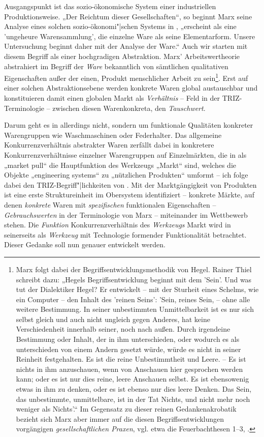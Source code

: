 \documentclass[12pt,a4paper]{article}
\begin{document}
Ausgangspunkt ist das sozio-ökonomische System einer industriellen
Produktionsweise. „Der Reichtum dieser Gesellschaften“, so beginnt Marx seine
Analyse eines solchen sozio-ökonomi"|schen Systems in \cite{MEW23}, „erscheint
als eine 'ungeheure Warensammlung', die einzelne Ware als seine
Elementarform. Unsere Untersuchung beginnt daher mit der Analyse der Ware.“
Auch wir starten mit diesem Begriff als einer hochgradigen Abstraktion.  Marx'
Arbeitswertheorie abstrahiert im Begriff der \emph{Ware} bekanntlich von
sämtlichen qualitativen Eigenschaften außer der einen, Produkt menschlicher
Arbeit zu sein\footnote{Marx folgt dabei der Begriffsentwicklungsmethodik von
  Hegel. Rainer Thiel \cite[S. 190]{Thiel2007} schreibt dazu: „Hegels
  Begriffsentwicklung beginnt mit dem 'Sein'. Und was tut der Dialektiker
  Hegel? Er entwickelt – mit der Sturheit eines Schelms, wie ein Computer –
  den Inhalt des 'reinen Seins': 'Sein, reines Sein, -- ohne alle weitere
  Bestimmung. In seiner unbestimmten Unmittelbarkeit ist es nur sich selbst
  gleich und auch nicht ungleich gegen Anderes, hat keine Verschiedenheit
  innerhalb seiner, noch nach außen. Durch irgendeine Bestimmung oder Inhalt,
  der in ihm unterschieden, oder wodurch es als unterschieden von einem Andern
  gesetzt würde, würde es nicht in seiner Reinheit festgehalten. Es ist die
  reine Unbestimmtheit und Leere. – Es ist nichts in ihm anzuschauen, wenn von
  Anschauen hier gesprochen werden kann; oder es ist nur dies reine, leere
  Anschauen selbst. Es ist ebensowenig etwas in ihm zu denken, oder es ist
  ebenso nur dies leere Denken. Das Sein, das unbestimmte, unmittelbare, ist
  in der Tat Nichts, und nicht mehr noch weniger als Nichts'.“ Im Gegensatz zu
  dieser reinen Gedankenakrobatik bezieht sich Marx aber immer auf die diesen
  Begriffsentwicklungen vorgängigen \emph{gesellschaftlichen Praxen},
  vgl. etwa die Feuerbachthesen 1--3, \cite{MEW3}.}.  Erst auf einer solchen
Abstraktionsebene werden konkrete Waren global austauschbar und konstituieren
damit einen globalen Markt als \emph{Verhältnis} -- Feld in der
TRIZ-Terminologie -- zwischen diesen Warenkonkreta, den \emph{Tauschwert}.

Darum geht es in \cite{TESE2018} allerdings nicht, sondern um funktionale
Qualitäten konkreter Warengruppen wie Waschmaschinen oder Federhalter. Das
allgemeine Konkurrenzverhältnis abstrakter Waren zerfällt dabei in konkretere
Konkurrenzverhältnisse einzelner Warengruppen auf Einzelmärkten, die in
\cite{TESE2018} als „market pull“ die Hauptfunktion des Werkzeugs „Markt“
sind, welches die Objekte „engineering systems“ zu „nützlichen Produkten“
umformt -- ich folge dabei den TRIZ-Begriff"|lichkeiten von \cite{TT}.  Mit
der Marktgängigkeit von Produkten ist eine erste Struktureinheit im Obersystem
identifiziert -- konkrete Märkte, auf denen \emph{konkrete} Waren mit
\emph{spezifischen} funktionalen Eigenschaften -- \emph{Gebrauchswerten} in
der Terminologie von Marx -- miteinander im Wettbewerb stehen.  Die
\emph{Funktion} Konkurrenzverhältnis des \emph{Werkzeugs} Markt wird in
\cite{TESE2018} seinerseits als \emph{Werkzeug} mit Technologie formender
Funktionalität betrachtet.  Dieser Gedanke soll nun genauer entwickelt werden.
\end{document}
